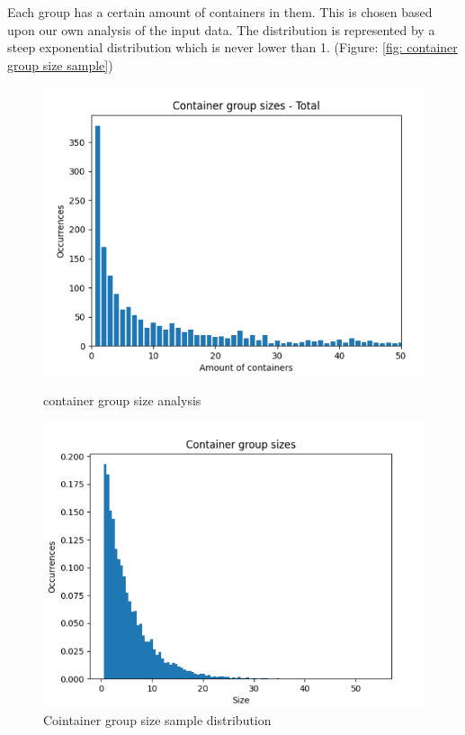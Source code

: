 \documentclass[]{article}
\begin{document}
Each group has a certain amount of containers in them. This is chosen based
upon our own analysis of the input data. The distribution is represented by a
steep exponential distribution which is never lower than 1. (Figure: \ref{fig:
	container group size sample})
\begin{figure}[!tbp]
	\centering
	\begin{minipage}[b]{0.45\textwidth}
		\includegraphics[width=\textwidth]{Afbeeldingen/container_group_sizes.png}
		\caption{container group size analysis}
	\end{minipage}
	\hfill
	\begin{minipage}[b]{0.44\textwidth}
		\includegraphics[width=\textwidth]{Afbeeldingen/container_group_size_sample.png}
		\caption{Cointainer group size sample distribution}
		\label{fig: container group size sample}
	\end{minipage}
\end{figure}
\end{document}
